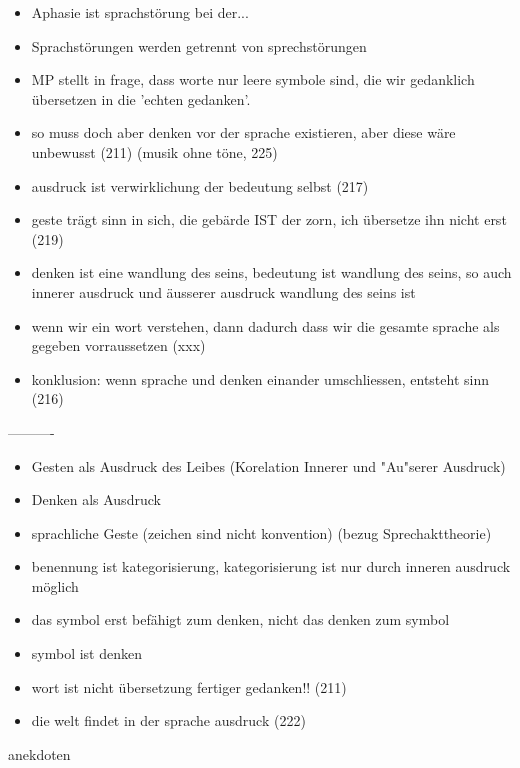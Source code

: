 \documentclass[a4paper, emulatestandardclasses, 12pt]{scrartcl}
\begin{document}
\begin{onehalfspace}
\begin{itemize}
  \item Aphasie ist sprachstörung bei der...
  \item Sprachstörungen werden getrennt von sprechstörungen
  \item MP stellt in frage, dass worte nur leere symbole sind, die wir gedanklich übersetzen in die 'echten gedanken'.
  \item so muss doch aber denken vor der sprache existieren, aber diese wäre unbewusst (211) (musik ohne töne, 225)
  \item ausdruck ist verwirklichung der bedeutung selbst (217)
  \item geste trägt sinn in sich, die gebärde IST der zorn, ich übersetze ihn nicht erst (219)
  \item denken ist eine wandlung des seins, bedeutung ist wandlung des seins, so auch innerer ausdruck und äusserer ausdruck wandlung des seins ist
  \item wenn wir ein wort verstehen, dann dadurch dass wir die gesamte sprache als gegeben vorraussetzen (xxx)
  \item konklusion: wenn sprache und denken einander umschliessen, entsteht sinn (216)
\end{itemize}

----------

\begin{itemize}
  \item Gesten als Ausdruck des Leibes (Korelation Innerer und "Au"serer Ausdruck)
  \item Denken als Ausdruck
  \item sprachliche Geste (zeichen sind nicht konvention) (bezug Sprechakttheorie)
  \item benennung ist kategorisierung, kategorisierung ist nur durch inneren ausdruck möglich
  \item das symbol erst befähigt zum denken, nicht das denken zum symbol
  \item symbol ist denken
  \item wort ist nicht übersetzung fertiger gedanken!! (211)
  \item die welt findet in der sprache ausdruck (222) 
\end{itemize}



anekdoten


\end{onehalfspace}
\end{document}
